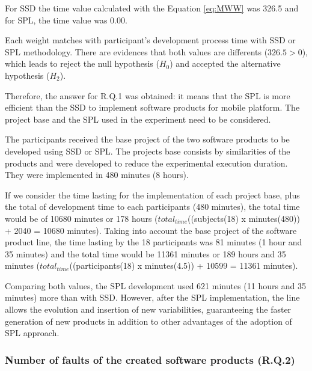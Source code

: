 \begin{itemize}
For SSD the time value calculated with the Equation \ref{eq:MWW} was 326.5 and for SPL, the time value was 0.00.

Each weight matches with participant's development process time with SSD or SPL methodology. There are evidences that both values are differents ($326.5>0$), which leads to reject the null hypothesis ($H_0$) and accepted the alternative hypothesis ($H_{2}$).

Therefore, the answer for R.Q.1 was obtained: it means that the SPL is more efficient than the SSD to implement software products for mobile platform. The project base and the SPL used in the experiment need to be considered.

The participants received the base project of the two software products to be developed using SSD or SPL. The projects base consists by similarities of the products and were developed to reduce the experimental execution duration. They were implemented in 480 minutes (8 hours).

If we consider the time lasting for the implementation of each project base, plus the total of development time to each participants (480 minutes), the total time would be of 10680 minutes or 178 hours ($total_{time}$((subje\allowbreak cts(18) x minutes(480)) + 2040 = 10680 minutes). Taking into account the base project of the software product line, the time lasting by the 18 participants was 81 minutes (1 hour and 35 minutes) and the total time would be 11361 minutes or 189 hours and 35 minutes ($total_{time}$((participants(18) x minutes(4.5)) + 10599 = 11361 minutes). 

Comparing both values, the SPL development used 621 minutes (11 hours and 35 minutes) more than with SSD. However, after the SPL implementation, the line allows the evolution and insertion of new variabilities, guaranteeing the faster generation of new products in addition to other advantages of the adoption of SPL approach.

\end{itemize}

\subsubsection{Number of faults of the created software products (R.Q.2)}

